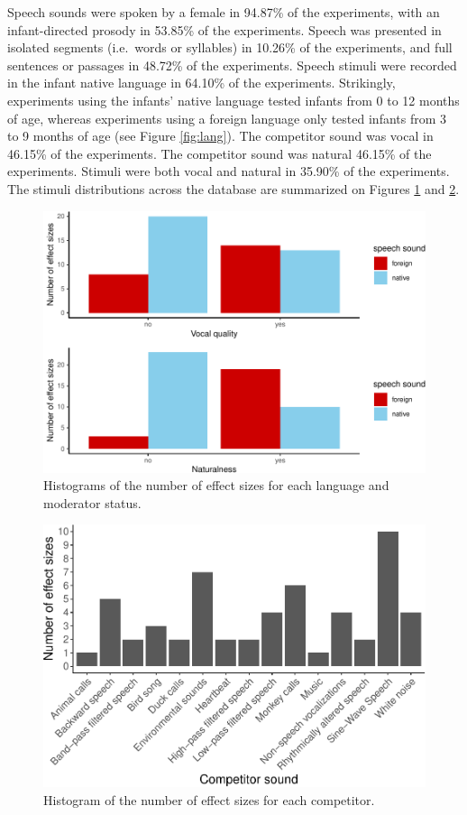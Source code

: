 \documentclass[
  english,
  man]{apa6}
\begin{document}
Speech sounds were spoken by a female in 94.87\% of the experiments, with an infant-directed prosody in 53.85\% of the experiments. Speech was presented in isolated segments (i.e.~words or syllables) in 10.26\% of the experiments, and full sentences or passages in 48.72\% of the experiments. Speech stimuli were recorded in the infant native language in 64.10\% of the experiments. Strikingly, experiments using the infants' native language tested infants from 0 to 12 months of age, whereas experiments using a foreign language only tested infants from 3 to 9 months of age (see Figure \ref{fig:lang}).
The competitor sound was vocal in 46.15\% of the experiments. The competitor sound was natural 46.15\% of the experiments. Stimuli were both vocal and natural in 35.90\% of the experiments.
The stimuli distributions across the database are summarized on Figures \ref{fig:stimuli} and \ref{fig:competitors}.

\begin{figure}
\centering
\includegraphics{MA_speech_pref_files/figure-latex/stimuli-1.pdf}
\caption{\label{fig:stimuli}Histograms of the number of effect sizes for each language and moderator status.}
\end{figure}

\begin{figure}
\centering
\includegraphics{MA_speech_pref_files/figure-latex/competitors-1.pdf}
\caption{\label{fig:competitors}Histogram of the number of effect sizes for each competitor.}
\end{figure}
\end{document}
